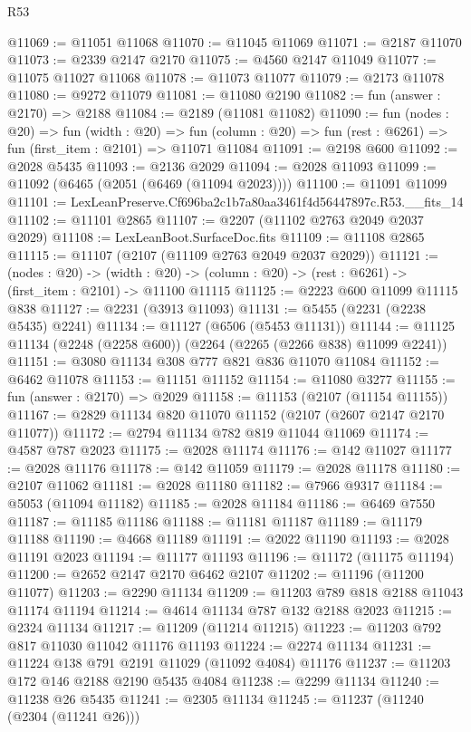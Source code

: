 \begin{lexlean}{R53}
\begin{coremodule}
@11069 := @11051 @11068
@11070 := @11045 @11069
@11071 := @2187 @11070
@11073 := @2339 @2147 @2170
@11075 := @4560 @2147 @11049
@11077 := @11075 @11027 @11068
@11078 := @11073 @11077
@11079 := @2173 @11078
@11080 := @9272 @11079
@11081 := @11080 @2190
@11082 := fun (answer : @2170) => @2188
@11084 := @2189 (@11081 @11082)
@11090 := fun (nodes : @20) =>
  fun (width : @20) =>
  fun (column : @20) => fun (rest : @6261) => fun (first_item : @2101) => @11071 @11084
@11091 := @2198 @600
@11092 := @2028 @5435
@11093 := @2136 @2029
@11094 := @2028 @11093
@11099 := @11092 (@6465 (@2051 (@6469 (@11094 @2023))))
@11100 := @11091 @11099
@11101 := LexLeanPreserve.Cf696ba2c1b7a80aa3461f4d56447897c.R53.__fits_14
@11102 := @11101 @2865
@11107 := @2207 (@11102 @2763 @2049 @2037 @2029)
@11108 := LexLeanBoot.SurfaceDoc.fits
@11109 := @11108 @2865
@11115 := @11107 (@2107 (@11109 @2763 @2049 @2037 @2029))
@11121 := (nodes : @20) ->
  (width : @20) -> (column : @20) -> (rest : @6261) -> (first_item : @2101) -> @11100 @11115
@11125 := @2223 @600 @11099 @11115 @838
@11127 := @2231 (@3913 @11093)
@11131 := @5455 (@2231 (@2238 @5435) @2241)
@11134 := @11127 (@6506 (@5453 @11131))
@11144 := @11125 @11134 (@2248 (@2258 @600)) (@2264 (@2265 (@2266 @838) @11099 @2241))
@11151 := @3080 @11134 @308 @777 @821 @836 @11070 @11084
@11152 := @6462 @11078
@11153 := @11151 @11152
@11154 := @11080 @3277
@11155 := fun (answer : @2170) => @2029
@11158 := @11153 (@2107 (@11154 @11155))
@11167 := @2829 @11134 @820 @11070 @11152 (@2107 (@2607 @2147 @2170 @11077))
@11172 := @2794 @11134 @782 @819 @11044 @11069
@11174 := @4587 @787 @2023
@11175 := @2028 @11174
@11176 := @142 @11027
@11177 := @2028 @11176
@11178 := @142 @11059
@11179 := @2028 @11178
@11180 := @2107 @11062
@11181 := @2028 @11180
@11182 := @7966 @9317
@11184 := @5053 (@11094 @11182)
@11185 := @2028 @11184
@11186 := @6469 @7550
@11187 := @11185 @11186
@11188 := @11181 @11187
@11189 := @11179 @11188
@11190 := @4668 @11189
@11191 := @2022 @11190
@11193 := @2028 @11191 @2023
@11194 := @11177 @11193
@11196 := @11172 (@11175 @11194)
@11200 := @2652 @2147 @2170 @6462 @2107
@11202 := @11196 (@11200 @11077)
@11203 := @2290 @11134
@11209 := @11203 @789 @818 @2188 @11043 @11174 @11194
@11214 := @4614 @11134 @787 @132 @2188 @2023
@11215 := @2324 @11134
@11217 := @11209 (@11214 @11215)
@11223 := @11203 @792 @817 @11030 @11042 @11176 @11193
@11224 := @2274 @11134
@11231 := @11224 @138 @791 @2191 @11029 (@11092 @4084) @11176
@11237 := @11203 @172 @146 @2188 @2190 @5435 @4084
@11238 := @2299 @11134
@11240 := @11238 @26 @5435
@11241 := @2305 @11134
@11245 := @11237 (@11240 (@2304 (@11241 @26)))

\end{coremodule}
\end{lexlean}

